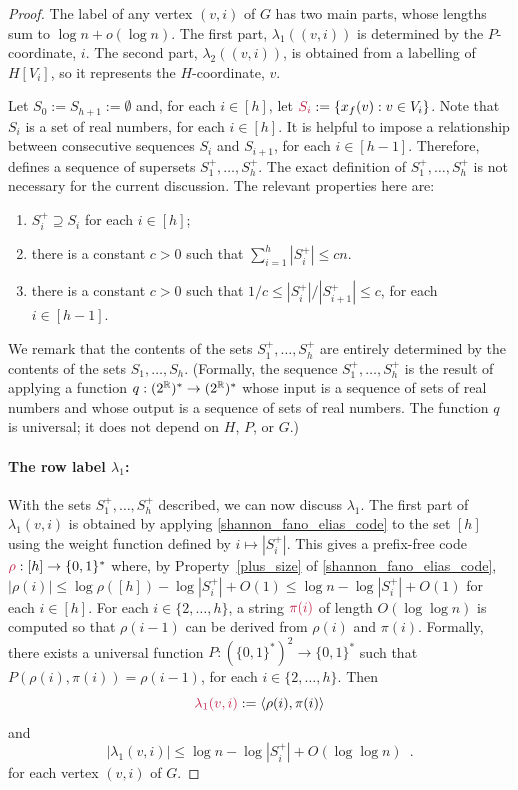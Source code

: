 \documentclass{patmorin}
\makeatletter
\renewcommand{\le}{\leqslant}
\newcommand{\defin}[1]{\emph{\textcolor{brightmaroon}{#1}}}
\def\mathcolor#1#{\@mathcolor{#1}}
\def\@mathcolor#1#2#3{%
  \protect\leavevmode
  \begingroup
    \color#1{#2}#3%
  \endgroup
}
\newcommand{\mathdefin}[1]{\mathcolor{brightmaroon}{#1}}
\newcommand{\Oh}{O}
\makeatother
\begin{document}
\begin{proof}
  The label of any vertex $(v,i)$ of $G$ has two main parts, whose lengths sum to $\log n+o(\log n)$.
  The first part, $\lambda_1((v,i))$ is determined by the $P$-coordinate, $i$.
  The second part, $\lambda_2((v,i))$, is obtained from a labelling of $H[V_i]$, so it represents the $H$-coordinate, $v$.

  Let $S_0:=S_{h+1}:=\emptyset$ and,
  for each $i\in[h]$, let $\mathdefin{S_i}:=\{x_f(v):v\in V_i\}$.
  Note that $S_i$ is a set of real numbers, for each $i\in[h]$.
  It is helpful to impose a relationship between consecutive sequences $S_i$ and $S_{i+1}$, for each $i\in[h-1]$. Therefore, \cite{dujmovic.esperet.ea:adjacency} defines a sequence of supersets \defin{$S^+_1,\ldots,S^+_h$}. The exact definition of $S^+_1,\ldots,S^+_h$ is not necessary for the current discussion.
  The relevant properties here are:
  \begin{enumerate}[nosep,label=(\alph*)]
    \item\label{plus_superset} $S^+_i\supseteq S_i$ for each $i\in[h]$;
    \item\label{plus_size} there is a constant $c>0$ such that $\sum_{i=1}^h |S^+_i|\le cn$.
    \item\label{plus_ratio} there is a constant $c>0$ such that
          $1/c\le |S^+_i|/|S^+_{i+1}|\le c$, for each $i\in[h-1]$.
  \end{enumerate}
  We remark that the contents of the sets $S^+_1,\ldots,S^+_h$ are entirely determined by the contents of the sets $S_1,\ldots,S_h$.
  (Formally, the sequence $S^+_1,\ldots,S^+_h$ is the result of applying a function $q:(2^{\mathbb{R}})^*\to (2^{\mathbb{R}})^*$ whose input is a sequence of sets of real numbers and whose output is a sequence of sets of real numbers. The function $q$ is universal; it does not depend on $H$, $P$, or $G$.)

  \paragraph{\boldmath The row label $\lambda_1$:}
  With the sets $S^+_1,\ldots,S^+_h$ described, we can now discuss $\lambda_1$.
  The first part of $\lambda_1(v,i)$ is obtained by applying \cref{shannon_fano_elias_code} to the set $[h]$ using the weight function defined by $i \mapsto |S^+_i|$. This gives a prefix-free code $\mathdefin{\rho}:[h]\to\{0,1\}^*$ where, by Property~\ref{plus_size} of \cref{shannon_fano_elias_code}, $|\rho(i)|\le \log\rho([h]) - \log|S^+_i| + \Oh(1)\le \log n - \log|S^+_i| + \Oh(1)$ for each $i\in[h]$.
  For each $i\in\{2,\ldots,h\}$, a string $\mathdefin{\pi(i)}$ of length $\Oh(\log\log n)$ is computed so that $\rho(i-1)$ can be derived from $\rho(i)$ and $\pi(i)$.  Formally, there exists a universal function $P:(\{0,1\}^*)^2\to\{0,1\}^*$ such that $P(\rho(i),\pi(i))=\rho(i-1)$, for each $i\in\{2,\ldots,h\}$.
  Then
  \[
    \mathdefin{\lambda_1(v,i)}:=\langle \rho(i),\pi(i)\rangle
  \]
  and
  \begin{equation}
    |\lambda_1(v,i)|\le \log n - \log |S^+_i| + \Oh(\log\log n) \enspace .
    \label{lambda_one_length}
  \end{equation}
  for each vertex $(v,i)$ of $G$.


\end{proof}
\end{document}

